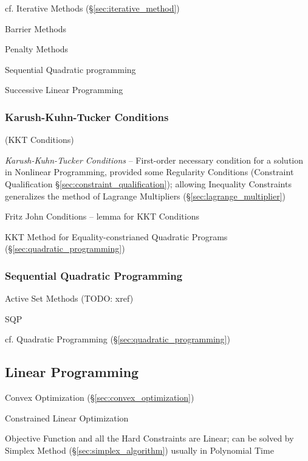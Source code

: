 \fist cf. Iterative Methods (\S\ref{sec:iterative_method})

Barrier Methods

Penalty Methods

Sequential Quadratic programming

Successive Linear Programming



\subsubsection{Karush-Kuhn-Tucker Conditions}\label{sec:karush_kuhn_tucker}

(KKT Conditions)

\emph{Karush-Kuhn-Tucker Conditions} -- First-order necessary condition for a
solution in Nonlinear Programming, provided some Regularity Conditions
(Constraint Qualification \S\ref{sec:constraint_qualification});
allowing Inequality Constraints generalizes the method of Lagrange Multipliers
(\S\ref{sec:lagrange_multiplier})

Fritz John Conditions -- lemma for KKT Conditions

\fist KKT Method for Equality-constrianed Quadratic Programs
(\S\ref{sec:quadratic_programming})



\subsubsection{Sequential Quadratic Programming}
\label{sec:sequential_quadratic_programming}

Active Set Methods (TODO: xref)

SQP

\fist cf. Quadratic Programming (\S\ref{sec:quadratic_programming})



\subsection{Linear Programming}\label{sec:linear_programming}

\fist Convex Optimization (\S\ref{sec:convex_optimization})

Constrained Linear Optimization

Objective Function and all the Hard Constraints are Linear; can be solved by
Simplex Method (\S\ref{sec:simplex_algorithm}) usually in Polynomial Time

